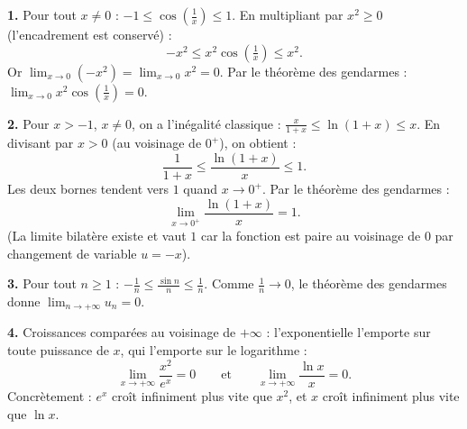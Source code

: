 \documentclass[11pt]{article}
\begin{document}
\begin{corrige}
\textbf{1.} Pour tout $x \neq 0$ : $-1 \le \cos\left(\frac{1}{x}\right) \le 1$. En multipliant par $x^2 \ge 0$ (l'encadrement est conservé) :
\[ -x^2 \le x^2 \cos\left(\tfrac{1}{x}\right) \le x^2. \]
Or $\lim_{x \to 0} (-x^2) = \lim_{x \to 0} x^2 = 0$. Par le théorème des gendarmes : $\boxed{\lim_{x \to 0} x^2 \cos\left(\tfrac{1}{x}\right) = 0}$.

\textbf{2.} Pour $x > -1$, $x \neq 0$, on a l'inégalité classique : $\frac{x}{1+x} \le \ln(1+x) \le x$.
En divisant par $x > 0$ (au voisinage de $0^+$), on obtient :
\[ \frac{1}{1+x} \le \frac{\ln(1+x)}{x} \le 1. \]
Les deux bornes tendent vers $1$ quand $x \to 0^+$. Par le théorème des gendarmes :
\[ \boxed{\lim_{x \to 0^+} \frac{\ln(1+x)}{x} = 1}. \]
(La limite bilatère existe et vaut $1$ car la fonction est paire au voisinage de $0$ par changement de variable $u=-x$).

\textbf{3.} Pour tout $n \ge 1$ : $-\frac{1}{n} \le \frac{\sin n}{n} \le \frac{1}{n}$. Comme $\frac{1}{n} \to 0$, le théorème des gendarmes donne $\boxed{\lim_{n \to +\infty} u_n = 0}$.

\textbf{4.} Croissances comparées au voisinage de $+\infty$ : l'exponentielle l'emporte sur toute puissance de $x$, qui l'emporte sur le logarithme :
\[ \boxed{\lim_{x \to +\infty} \frac{x^2}{e^x} = 0} \qquad \text{et} \qquad \boxed{\lim_{x \to +\infty} \frac{\ln x}{x} = 0}. \]
Concrètement : $e^x$ croît infiniment plus vite que $x^2$, et $x$ croît infiniment plus vite que $\ln x$.
\end{corrige}
\end{document}
